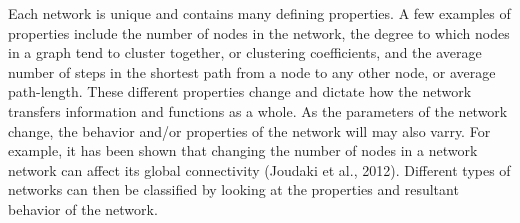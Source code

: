 \documentclass[11pt,letterpaper,doublespacing,titlepage]{article}
\begin{document}

\par
Each network is unique and contains many defining properties. A few examples of properties include the number of nodes in the network, the degree to which nodes in a graph tend to cluster together, or  clustering coefficients, and the average number of steps in the shortest path from a node to any other node, or average path-length. These different properties change and dictate how the network transfers information and functions as a whole. As the parameters of the network change, the behavior and/or properties of the network will may also varry. For example, it has been shown that changing the number of nodes in a network network can affect its global connectivity (Joudaki et al., 2012). Different types of networks can then be classified by looking at the properties and resultant behavior of the network.
\end{document}
